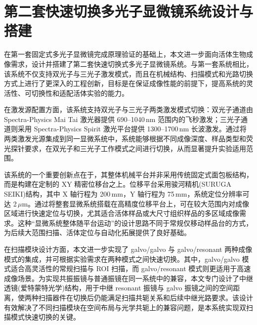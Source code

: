 \section{第二套快速切换多光子显微镜系统设计与搭建}\label{4.3}

在第一套固定式多光子显微镜完成原理验证的基础上，本文进一步面向活体生物成像需求，设计并搭建了第二套快速切换式多光子显微镜系统。与第一套系统相比，该系统不仅支持双光子与三光子激发模式，而且在机械结构、扫描模式和光路切换方式上进行了更深入的工程创新，目标是在保证成像性能的前提下，提高系统的灵活性、可切换性和适配活体实验的能力。

在激发源配置方面，该系统支持双光子与三光子两类激发模式切换：双光子通道由 Spectra-Physics Mai Tai 激光器提供 690--1040\,nm 范围内的飞秒激发；三光子通道则采用 Spectra-Physics Spirit 激光平台提供 1300--1700\,nm 长波激发。通过将两类激发光源集成到同一显微系统中，系统能够根据不同成像深度、样品类型和荧光探针要求，在双光子和三光子工作模式之间进行切换，从而显著提升实验适用范围。

该系统的一个重要创新点在于，其整体机械平台并非采用传统固定式面包板结构，而是构建在定制的 XY 精密位移台之上。位移平台采用骏河精机(SURUGA SEIKI)结构，其中 X 轴行程为 200\,mm，Y 轴行程为 75\,mm，系统定位分辨率可达 2\,$\mu$m。通过将整套显微系统搭载在高精度位移平台上，可在较大范围内对成像区域进行快速定位与切换，尤其适合活体样品或大尺寸组织样品的多区域成像需求。这种``显微系统整体随平台运动''的设计思路不同于常规仅移动样品台的方式，为后续大范围扫描、活体定位与自动化拓展提供了良好基础。

在扫描模块设计方面，本文进一步实现了 galvo/galvo 与 galvo/resonant 两种成像模式的集成，并可根据实验需求在两种模式之间快速切换。其中，galvo/galvo 模式适合高灵活性的常规扫描与 ROI 扫描，而 galvo/resonant 模式则更适用于高速成像场景。为实现共振振镜与普通振镜在同一系统中的兼容，本文专门设计了中继透镜(爱特蒙特光学)结构，用于中继 resonant 振镜与 galvo 振镜之间的空间距离，使两种扫描器件在切换后仍能满足扫描共轭关系和后续中继光路要求。该设计有效解决了不同扫描模块在空间布局与光学共轭上的兼容问题，是本系统实现双扫描模式快速切换的关键。

